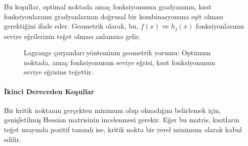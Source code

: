 Bu koşullar, optimal noktada amaç fonksiyonunun gradyanının, kısıt fonksiyonlarının gradyanlarının doğrusal bir kombinasyonuna eşit olması gerektiğini ifade eder. Geometrik olarak, bu, $f(x)$ ve $h_j(x)$ fonksiyonlarının seviye eğrilerinin teğet olması anlamına gelir.

\begin{figure}
\centering
{}
\caption{Lagrange çarpanları yönteminin geometrik yorumu: Optimum noktada, amaç fonksiyonunun seviye eğrisi, kısıt fonksiyonunun seviye eğrisine teğettir.}
\label{fig:lagrange_geometry}
\end{figure}

\paragraph{İkinci Dereceden Koşullar}
Bir kritik noktanın gerçekten minimum olup olmadığını belirlemek için, genişletilmiş Hessian matrisinin incelenmesi gerekir. Eğer bu matris, kısıtların teğet uzayında pozitif tanımlı ise, kritik nokta bir yerel minimum olarak kabul edilir.

